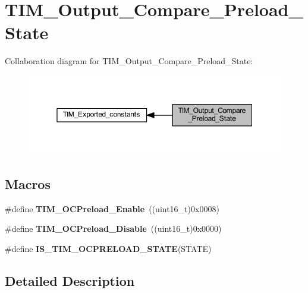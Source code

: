 \hypertarget{group___t_i_m___output___compare___preload___state}{}\section{T\+I\+M\+\_\+\+Output\+\_\+\+Compare\+\_\+\+Preload\+\_\+\+State}
\label{group___t_i_m___output___compare___preload___state}
Collaboration diagram for T\+I\+M\+\_\+\+Output\+\_\+\+Compare\+\_\+\+Preload\+\_\+\+State\+:\nopagebreak
\begin{figure}[H]
\begin{center}
\leavevmode
\includegraphics[width=350pt]{group___t_i_m___output___compare___preload___state}
\end{center}
\end{figure}
\subsection*{Macros}
\begin{DoxyCompactItemize}
\item 
\mbox{\label{group___t_i_m___output___compare___preload___state_gad647db2e7a89bd6db3c787680afccf8f}} 
\#define {\bfseries T\+I\+M\+\_\+\+O\+C\+Preload\+\_\+\+Enable}~((uint16\+\_\+t)0x0008)
\item 
\mbox{\label{group___t_i_m___output___compare___preload___state_ga0cbcc3c4d90d61d85550db2173737ed6}} 
\#define {\bfseries T\+I\+M\+\_\+\+O\+C\+Preload\+\_\+\+Disable}~((uint16\+\_\+t)0x0000)
\item 
\#define {\bfseries I\+S\+\_\+\+T\+I\+M\+\_\+\+O\+C\+P\+R\+E\+L\+O\+A\+D\+\_\+\+S\+T\+A\+TE}(S\+T\+A\+TE)
\end{DoxyCompactItemize}


\subsection{Detailed Description}


